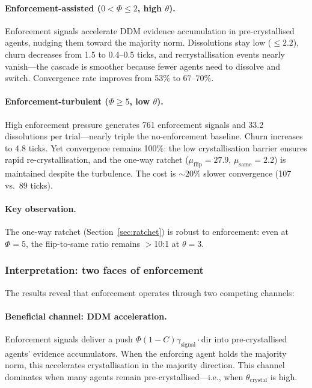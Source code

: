 \documentclass[11pt,a4paper]{article}
\begin{document}
\paragraph{Enforcement-assisted ($0 < \Phi \leq 2$, high $\theta$).} Enforcement signals accelerate DDM evidence accumulation in pre-crystallised agents, nudging them toward the majority norm. Dissolutions stay low ($\leq 2.2$), churn decreases from 1.5 to 0.4--0.5 ticks, and recrystallisation events nearly vanish---the cascade is smoother because fewer agents need to dissolve and switch. Convergence rate improves from 53\% to 67--70\%.

\paragraph{Enforcement-turbulent ($\Phi \geq 5$, low $\theta$).} High enforcement pressure generates 761 enforcement signals and 33.2 dissolutions per trial---nearly triple the no-enforcement baseline. Churn increases to 4.8 ticks. Yet convergence remains 100\%: the low crystallisation barrier ensures rapid re-crystallisation, and the one-way ratchet ($\mu_{\mathrm{flip}} = 27.9$, $\mu_{\mathrm{same}} = 2.2$) is maintained despite the turbulence. The cost is ${\sim}20\%$ slower convergence (107 vs.\ 89 ticks).

\paragraph{Key observation.} The one-way ratchet (Section~\ref{sec:ratchet}) is robust to enforcement: even at $\Phi = 5$, the flip-to-same ratio remains $>$10:1 at $\theta = 3$.

\subsubsection{Interpretation: two faces of enforcement}
\label{sec:two_faces}

The results reveal that enforcement operates through two competing channels:

\paragraph{Beneficial channel: DDM acceleration.} Enforcement signals deliver a push $\Phi(1-C)\gamma_{\mathrm{signal}} \cdot \mathrm{dir}$ into pre-crystallised agents' evidence accumulators. When the enforcing agent holds the majority norm, this accelerates crystallisation in the majority direction. This channel dominates when many agents remain pre-crystallised---i.e., when $\theta_{\mathrm{crystal}}$ is high.
\end{document}
